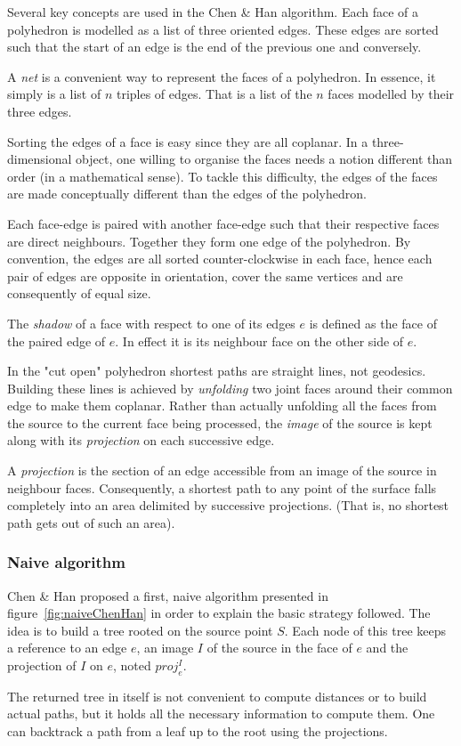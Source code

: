 Several key concepts are used in the Chen \& Han algorithm. Each face of a polyhedron is modelled as a list of three oriented edges. These edges are sorted such that the start of an edge is the end of the previous one and conversely.\par
A \textit{net} is a convenient way to represent the faces of a polyhedron. In essence, it simply is a list of $n$ triples of edges. That is a list of the $n$ faces modelled by their three edges.\par
Sorting the edges of a face is easy since they are all coplanar. In a three-dimensional object, one willing to organise the faces needs a notion different than order (in a mathematical sense). To tackle this difficulty, the edges of the faces are made conceptually different than the edges of the polyhedron.\par
Each face-edge is paired with another face-edge such that their respective faces are direct neighbours. Together they form one edge of the polyhedron. By convention, the edges are all sorted counter-clockwise in each face, hence each pair of edges are opposite in orientation, cover the same vertices and are consequently of equal size.\par
The \textit{shadow} of a face with respect to one of its edges $e$ is defined as the face of the paired edge of $e$. In effect it is its neighbour face on the other side of $e$.\par
In the "cut open" polyhedron shortest paths are straight lines, not geodesics. Building these lines is achieved by \textit{unfolding} two joint faces around their common edge to make them coplanar. Rather than actually unfolding all the faces from the source to the current face being processed, the \textit{image} of the source is kept along with its \textit{projection} on each successive edge.\par
A \textit{projection} is the section of an edge accessible from an image of the source in neighbour faces. Consequently, a shortest path to any point of the surface falls completely into an area delimited by successive projections. (That is, no shortest path gets out of such an area).

\subsubsection{Naive algorithm}

Chen \& Han \cite{chen-han} proposed a first, naive algorithm presented in figure~\ref{fig:naiveChenHan} in order to explain the basic strategy followed. The idea is to build a tree rooted on the source point $S$. Each node of this tree keeps a reference to an edge $e$, an image $I$ of the source in the face of $e$ and the projection of $I$ on $e$, noted $proj^I_e$.\par
The returned tree in itself is not convenient to compute distances or to build actual paths, but it holds all the necessary information to compute them. One can backtrack a path from a leaf up to the root using the projections.

